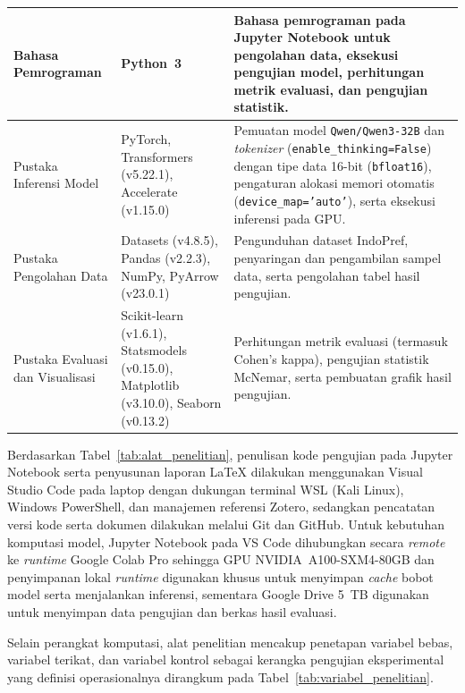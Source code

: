 \begin{table}[H]
{\begin{tabular}{|>{\raggedright\arraybackslash}p{2.55cm}|>{\raggedright\arraybackslash}p{3.15cm}|>{\raggedright\arraybackslash}p{6.95cm}|}
    \hline
    Bahasa Pemrograman & Python~3 & Bahasa pemrograman pada Jupyter Notebook untuk pengolahan data, eksekusi pengujian model, perhitungan metrik evaluasi, dan pengujian statistik. \\
    \hline
    Pustaka Inferensi Model & PyTorch, Transformers (v5.22.1), Accelerate (v1.15.0) & Pemuatan model \texttt{Qwen/\allowbreak Qwen3-\allowbreak 32B} dan \textit{tokenizer} (\texttt{enable\_thinking=False}) dengan tipe data 16-bit (\texttt{bfloat16}), pengaturan alokasi memori otomatis (\texttt{device\_map='auto'}), serta eksekusi inferensi pada GPU. \\
    \hline
    Pustaka Pengolahan Data & Datasets (v4.8.5), Pandas (v2.2.3), NumPy, PyArrow (v23.0.1) & Pengunduhan dataset IndoPref, penyaringan dan pengambilan sampel data, serta pengolahan tabel hasil pengujian. \\
    \hline
    Pustaka Evaluasi dan Visualisasi & Scikit-learn (v1.6.1), Statsmodels (v0.15.0), Matplotlib (v3.10.0), Seaborn (v0.13.2) & Perhitungan metrik evaluasi (termasuk Cohen's kappa), pengujian statistik McNemar, serta pembuatan grafik hasil pengujian. \\
    \hline
  \end{tabular}
  }
\end{table}

Berdasarkan Tabel~\ref{tab:alat_penelitian}, penulisan kode pengujian pada Jupyter Notebook serta penyusunan laporan \LaTeX{} dilakukan menggunakan Visual Studio Code pada laptop dengan dukungan terminal WSL (Kali Linux), Windows PowerShell, dan manajemen referensi Zotero, sedangkan pencatatan versi kode serta dokumen dilakukan melalui Git dan GitHub. Untuk kebutuhan komputasi model, Jupyter Notebook pada VS Code dihubungkan secara \textit{remote} ke \textit{runtime} Google Colab Pro sehingga GPU NVIDIA~A100-SXM4-80GB dan penyimpanan lokal \textit{runtime} digunakan khusus untuk menyimpan \textit{cache} bobot model serta menjalankan inferensi, sementara Google Drive 5~TB digunakan untuk menyimpan data pengujian dan berkas hasil evaluasi.

Selain perangkat komputasi, alat penelitian mencakup penetapan variabel bebas, variabel terikat, dan variabel kontrol sebagai kerangka pengujian eksperimental yang definisi operasionalnya dirangkum pada Tabel~\ref{tab:variabel_penelitian}.

